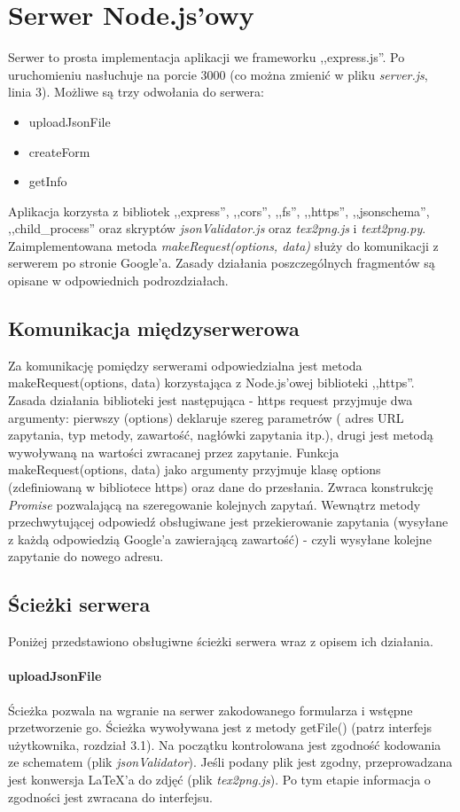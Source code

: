 \section{Serwer Node.js'owy}
Serwer to prosta implementacja aplikacji we frameworku ,,express.js''. Po uruchomieniu nasłuchuje na porcie 3000 (co można zmienić w pliku \textit{server.js}, linia 3). Możliwe są trzy odwołania do serwera:
\begin{itemize}
\item uploadJsonFile
\item createForm
\item getInfo
\end{itemize}
Aplikacja korzysta z bibliotek ,,express'', ,,cors'', ,,fs'', ,,https'', ,,jsonschema'', ,,child\_process''  oraz skryptów \textit{jsonValidator.js} oraz \textit{tex2png.js} i \textit{text2png.py}.
Zaimplementowana metoda \textit{makeRequest(options, data)} służy do komunikacji z serwerem po stronie Google'a.
\ind Zasady działania poszczególnych fragmentów są opisane w odpowiednich podrozdziałach.
\subsection{Komunikacja międzyserwerowa}
Za komunikację pomiędzy serwerami odpowiedzialna jest metoda makeRequest(options, data) korzystająca z Node.js'owej biblioteki ,,https''. Zasada działania biblioteki jest następująca - https request przyjmuje dwa argumenty: pierwszy (options) deklaruje szereg parametrów ( adres URL zapytania, typ metody, zawartość, nagłówki zapytania itp.), drugi jest metodą wywoływaną na wartości zwracanej przez zapytanie. 
\ind Funkcja makeRequest(options, data) jako argumenty przyjmuje klasę options (zdefiniowaną w bibliotece https) oraz dane do przesłania. Zwraca konstrukcję \textit{Promise} pozwalającą na szeregowanie kolejnych zapytań. Wewnątrz metody przechwytującej odpowiedź obsługiwane jest przekierowanie zapytania (wysyłane z każdą odpowiedzią Google'a zawierającą zawartość) - czyli wysyłane kolejne zapytanie do nowego adresu.
\subsection{Ścieżki serwera}
Poniżej przedstawiono obsługiwne ścieżki serwera wraz z opisem ich działania.
\paragraph{uploadJsonFile} Ścieżka pozwala na wgranie na serwer zakodowanego formularza i wstępne przetworzenie go. Ścieżka wywoływana jest z metody getFile() (patrz interfejs użytkownika, rozdział 3.1). Na początku kontrolowana jest zgodność kodowania ze schematem (plik \textit{jsonValidator}). Jeśli podany plik jest zgodny, przeprowadzana jest konwersja \LaTeX{}'a do zdjęć (plik \textit{tex2png.js}). Po tym etapie informacja o zgodności jest zwracana do interfejsu.
